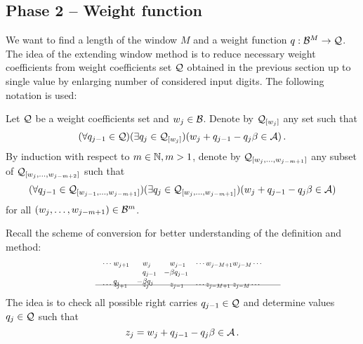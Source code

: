     
    





\subsection{Phase 2 -- Weight function}
    We want to find a length of the window $M$ and a weight function $q:\mathcal{B}^{M} \to \mathcal{Q}$. The idea of the extending window method is to reduce necessary weight coefficients from weight coefficients set $\mathcal{Q}$ obtained in the previous section up to single value by enlarging number of considered input digits. The following notation is used: 
    \begin{defn}
        Let $\mathcal{Q}$ be a weight coefficients set and $w_j\in \mathcal{B}$. Denote by $\mathcal{Q}_{[w_j]}$ any set such that
        $$
            (\forall q_{j-1} \in \mathcal{Q})(\exists q_j \in \mathcal{Q}_{[w_j]})(w_j + q_{j-1} - q_j \beta \in \mathcal{A})\,.
        $$
        By induction with respect to $m \in \mathbb{N}, m>1$, denote by $\mathcal{Q}_{[w_{j},\dots, w_{j-m+1}]}$ any subset of  $\mathcal{Q}_{[w_{j},\dots, w_{j-m+2}]}$ such that 
        $$
           (\forall q_{j-1} \in \mathcal{Q}_{[w_{j-1},\dots, w_{j-m+1}]})(\exists q_j \in \mathcal{Q}_{[w_{j},\dots, w_{j-m+1}]})(w_j + q_{j-1} - q_j \beta \in \mathcal{A})
        $$
        for all $(w_{j},\dots, w_{j-m+1})\in \mathcal{B}^{m}$.
    \end{defn}
  
    Recall the scheme of conversion for better understanding of the definition and method:
    \begin{align*}
        \hspace{130pt}\cdots\; &w_{j+1}&\!\! &w_j  & \!\!  &w_{j-1}&\cdots w_{j-M+1} &w_{j-M}\cdots \hspace{130pt} \\[-3pt] 
                         & &       &q_{j-1}& -&\beta q_{j-1} \\[-3pt]
                           &q_j&   -&\beta q_j &&\\[-15pt]      
    \intertext{\hspace{120pt}\line(1,0){250}} 
          \vspace{-15pt}
          \\[-30pt]
     \cdots\; &z_{j+1}& &z_j& &z_{j-1}& \cdots z_{j-M+1}\; &z_{j-M}\cdots                     
    \end{align*}     
    The idea is to check all possible right carries $q_{j-1}\in\mathcal{Q}$ and determine values $q_j\in\mathcal{Q}$ such that 
    $$
    z_j=w_j + q_{j-1} - q_j \beta \in \mathcal{A} \,.
    $$  
    

